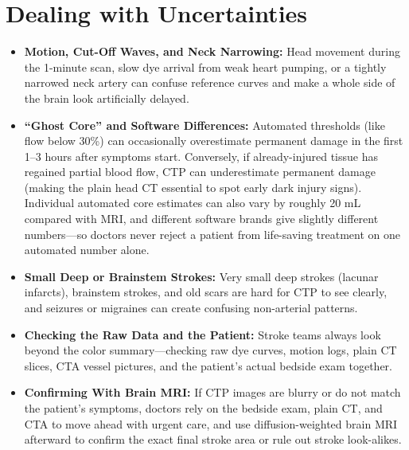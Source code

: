 \section{Dealing with Uncertainties}
\begin{itemize}
    \item \textbf{Motion, Cut-Off Waves, and Neck Narrowing:} Head movement during the 1-minute scan, slow dye arrival from weak heart pumping, or a tightly narrowed neck artery can confuse reference curves and make a whole side of the brain look artificially delayed.
    \item \textbf{``Ghost Core'' and Software Differences:} Automated thresholds (like flow below 30\%) can occasionally overestimate permanent damage in the first 1--3 hours after symptoms start. Conversely, if already-injured tissue has regained partial blood flow, CTP can underestimate permanent damage (making the plain head CT essential to spot early dark injury signs). Individual automated core estimates can also vary by roughly 20 mL compared with MRI, and different software brands give slightly different numbers---so doctors never reject a patient from life-saving treatment on one automated number alone.
    \item \textbf{Small Deep or Brainstem Strokes:} Very small deep strokes (lacunar infarcts), brainstem strokes, and old scars are hard for CTP to see clearly, and seizures or migraines can create confusing non-arterial patterns.
    \item \textbf{Checking the Raw Data and the Patient:} Stroke teams always look beyond the color summary---checking raw dye curves, motion logs, plain CT slices, CTA vessel pictures, and the patient's actual bedside exam together.
    \item \textbf{Confirming With Brain MRI:} If CTP images are blurry or do not match the patient's symptoms, doctors rely on the bedside exam, plain CT, and CTA to move ahead with urgent care, and use diffusion-weighted brain MRI afterward to confirm the exact final stroke area or rule out stroke look-alikes.
\end{itemize}

